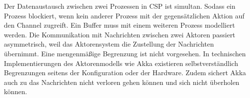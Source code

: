 Der Datenaustausch zwischen zwei Prozessen in \ac{CSP} ist simultan. Sodass ein Prozess blockiert, wenn kein anderer Prozess mit der gegensätzlichen Aktion auf den Channel zugreift. Ein Buffer muss mit einem weiteren Prozess modelliert werden. Die Kommunikation mit Nachrichten zwischen zwei Aktoren passiert asymmetrisch, weil das Aktorensystem die Zustellung der Nachrichten übernimmt. Eine mengenmäßige Begrenzung ist nicht vorgesehen. In technischen Implementierungen des Aktorenmodells wie Akka existieren selbstverständlich Begrenzungen seitens der Konfiguration oder der Hardware. Zudem sichert Akka auch zu das Nachrichten nicht verloren gehen können und sich nicht überholen können.

